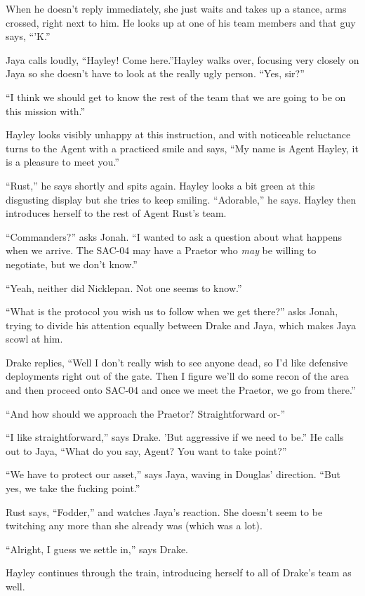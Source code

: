 When he doesn't reply immediately, she just waits and takes up a stance, arms crossed, right next to him.  He looks up at one of his team members and that guy says, ``'K.''

Jaya calls loudly, ``Hayley!  Come here.''Hayley walks over, focusing very closely on Jaya so she doesn't have to look at the really ugly person.  ``Yes, sir?''

``I think we should get to know the rest of the team that we are going to be on this mission with.''

Hayley looks visibly unhappy at this instruction, and with noticeable reluctance turns to the Agent with a practiced smile and says, ``My name is Agent Hayley, it is a pleasure to meet you.''

``Rust,'' he says shortly and spits again.  Hayley looks a bit green at this disgusting display but she tries to keep smiling.  ``Adorable,'' he says.  Hayley then introduces herself to the rest of Agent Rust's team.

``Commanders?'' asks Jonah.  ``I wanted to ask a question about what happens when we arrive.  The SAC-04 may have a Praetor who \textit{may} be willing to negotiate, but we don't know.''

``Yeah, neither did Nicklepan.  Not one seems to know.''

``What is the protocol you wish us to follow when we get there?'' asks Jonah, trying to divide his attention equally between Drake and Jaya, which makes Jaya scowl at him.

Drake replies, ``Well I don't really wish to see anyone dead, so I'd like defensive deployments right out of the gate.  Then I figure we'll do some recon of the area and then proceed onto SAC-04 and once we meet the Praetor, we go from there.''

``And how should we approach the Praetor?  Straightforward or-''

``I like straightforward,'' says Drake.  'But aggressive if we need to be.''  He calls out to Jaya, ``What do you say, Agent?  You want to take point?''

``We have to protect our asset,'' says Jaya, waving in Douglas' direction.  ``But yes, we take the fucking point.''

Rust says, ``Fodder,'' and watches Jaya's reaction.  She doesn't seem to be twitching any more than she already was (which was a lot).

``Alright, I guess we settle in,'' says Drake.

Hayley continues through the train, introducing herself to all of Drake's team as well.  

